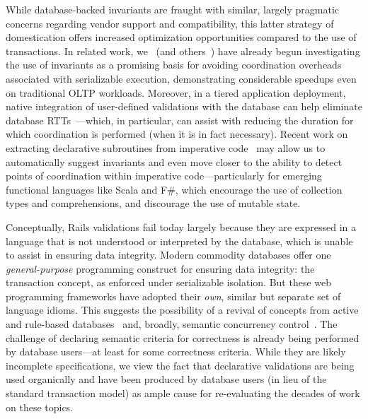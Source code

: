 While database-backed invariants are fraught with similar, largely
pragmatic concerns regarding vendor support and compatibility, this
latter strategy of domestication offers increased optimization
opportunities compared to the use of transactions. In related work,
we~\cite{coord-avoid} (and others~\cite{redblue-new}) have already
begun investigating the use of invariants as a promising basis for
avoiding coordination overheads associated with serializable
execution, demonstrating considerable speedups even on traditional
OLTP workloads. Moreover, in a tiered application deployment, native
integration of user-defined validations with the database can help
eliminate database RTTs~\cite{pyxis}---which, in particular, can
assist with reducing the duration for which coordination is performed
(when it is in fact necessary). Recent work on extracting declarative
subroutines from imperative code~\cite{statusquo,writes-forest} may allow us to
automatically suggest invariants and even move closer to the ability
to detect points of coordination within imperative code---particularly
for emerging functional languages like Scala and F\#, which encourage
the use of collection types and comprehensions, and discourage the use
of mutable state.

Conceptually, Rails validations fail today largely because they are
expressed in a language that is not understood or interpreted by the
database, which is unable to assist in ensuring data integrity. Modern
commodity databases offer one \textit{general-purpose} programming
construct for ensuring data integrity: the transaction concept, as
enforced under serializable isolation. But these web programming
frameworks have adopted their \textit{own}, similar but separate set
of language idioms. This suggests the possibility of a revival of concepts from
 active and rule-based databases~\cite{activedb-book} and, broadly,
 semantic concurrency control~\cite{tamer-book}. The challenge of
 declaring semantic criteria for correctness is already being performed
 by database users---at least for some correctness criteria. While they
 are likely incomplete specifications, we view the fact that
 declarative validations are being used organically and have been
 produced by database users (in lieu of the standard transaction model) as
 ample cause for re-evaluating the decades of work on these topics.


